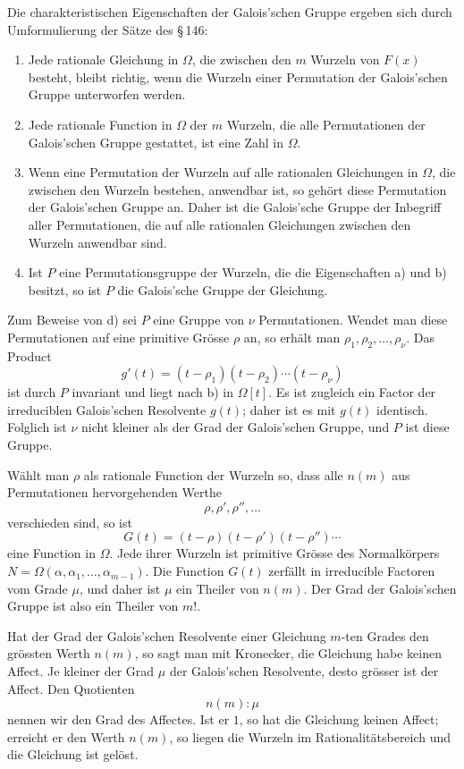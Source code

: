 \documentclass[11pt]{article}
\begin{document}
Die charakteristischen Eigenschaften der Galois'schen Gruppe ergeben sich durch Umformulierung der Sätze des \S\,146:

\begin{enumerate}[label=\alph*)]
\item Jede rationale Gleichung in $\Omega$, die zwischen den $m$ Wurzeln von $F(x)$ besteht, bleibt richtig, wenn die Wurzeln einer Permutation der Galois'schen Gruppe unterworfen werden.
\item Jede rationale Function in $\Omega$ der $m$ Wurzeln, die alle Permutationen der Galois'schen Gruppe gestattet, ist eine Zahl in $\Omega$.
\item Wenn eine Permutation der Wurzeln auf alle rationalen Gleichungen in $\Omega$, die zwischen den Wurzeln bestehen, anwendbar ist, so gehört diese Permutation der Galois'schen Gruppe an. Daher ist die Galois'sche Gruppe der Inbegriff aller Permutationen, die auf alle rationalen Gleichungen zwischen den Wurzeln anwendbar sind.
\item Ist $P$ eine Permutationsgruppe der Wurzeln, die die Eigenschaften a) und b) besitzt, so ist $P$ die Galois'sche Gruppe der Gleichung.
\end{enumerate}

Zum Beweise von d) sei $P$ eine Gruppe von $\nu$ Permutationen. Wendet man diese Permutationen auf eine primitive Grösse $\rho$ an, so erhält man $\rho_1,\rho_2,\ldots,\rho_\nu$. Das Product
\[
        g'(t)=(t-\rho_1)(t-\rho_2)\cdots(t-\rho_\nu)
\]
ist durch $P$ invariant und liegt nach b) in $\Omega[t]$. Es ist zugleich ein Factor der irreduciblen Galois'schen Resolvente $g(t)$; daher ist es mit $g(t)$ identisch. Folglich ist $\nu$ nicht kleiner als der Grad der Galois'schen Gruppe, und $P$ ist diese Gruppe.

Wählt man $\rho$ als rationale Function der Wurzeln so, dass alle $n(m)$ aus Permutationen hervorgehenden Werthe
\[
        \rho,\rho',\rho'',\ldots
\]
verschieden sind, so ist
\[
        G(t)=(t-\rho)(t-\rho')(t-\rho'')\cdots
\]
eine Function in $\Omega$. Jede ihrer Wurzeln ist primitive Grösse des Normalkörpers $N=\Omega(\alpha,\alpha_1,
\ldots,\alpha_{m-1})$. Die Function $G(t)$ zerfällt in irreducible Factoren vom Grade $\mu$, und daher ist $\mu$ ein Theiler von $n(m)$. Der Grad der Galois'schen Gruppe ist also ein Theiler von $m!$.

Hat der Grad der Galois'schen Resolvente einer Gleichung $m$-ten Grades den grössten Werth $n(m)$, so sagt man mit Kronecker, die Gleichung habe keinen Affect. Je kleiner der Grad $\mu$ der Galois'schen Resolvente, desto grösser ist der Affect. Den Quotienten
\[
        n(m):\mu
\]
nennen wir den Grad des Affectes. Ist er $1$, so hat die Gleichung keinen Affect; erreicht er den Werth $n(m)$, so liegen die Wurzeln im Rationalitätsbereich und die Gleichung ist gelöst.
\end{document}
